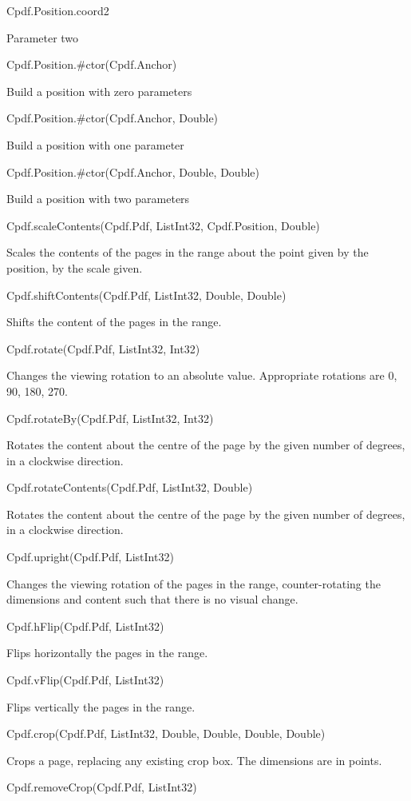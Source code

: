 Cpdf.Position.coord2

Parameter two

Cpdf.Position.#ctor(Cpdf.Anchor)

Build a position with zero parameters

Cpdf.Position.#ctor(Cpdf.Anchor, Double)

Build a position with one parameter

Cpdf.Position.#ctor(Cpdf.Anchor, Double, Double)

Build a position with two parameters

Cpdf.scaleContents(Cpdf.Pdf, List{Int32}, Cpdf.Position, Double)


Scales the contents of the
pages in the range about the point given by the position, by the
scale given.


Cpdf.shiftContents(Cpdf.Pdf, List{Int32}, Double, Double)


Shifts the content of the pages in
the range.


Cpdf.rotate(Cpdf.Pdf, List{Int32}, Int32)


Changes the viewing rotation to an
absolute value. Appropriate rotations are 0, 90, 180, 270.


Cpdf.rotateBy(Cpdf.Pdf, List{Int32}, Int32)


Rotates the content about the
centre of the page by the given number of degrees, in a clockwise
direction.


Cpdf.rotateContents(Cpdf.Pdf, List{Int32}, Double)


Rotates the content about the
centre of the page by the given number of degrees, in a clockwise
direction.


Cpdf.upright(Cpdf.Pdf, List{Int32})


Changes the viewing rotation of the pages in the
range, counter-rotating the dimensions and content such that there is no
visual change.


Cpdf.hFlip(Cpdf.Pdf, List{Int32})


Flips horizontally the pages in the range.


Cpdf.vFlip(Cpdf.Pdf, List{Int32})


Flips vertically the pages in the range.


Cpdf.crop(Cpdf.Pdf, List{Int32}, Double, Double, Double, Double)


Crops a page, replacing any existing
crop box. The dimensions are in points.


Cpdf.removeCrop(Cpdf.Pdf, List{Int32})



